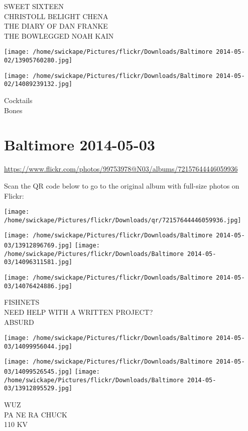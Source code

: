 \documentclass[10pt,letterpaper]{article}
\begin{document}
SWEET SIXTEEN\\
CHRISTOLL BELIGHT CHENA\\
THE DIARY OF DAN FRANKE\\
THE BOWLEGGED NOAH KAIN
\pagebreak

\texttt{[image: /home/swickape/Pictures/flickr/Downloads/Baltimore 2014-05-02/13905760280.jpg]}

\vspace{0.25in}
\texttt{[image: /home/swickape/Pictures/flickr/Downloads/Baltimore 2014-05-02/14089239132.jpg]}

Cocktails\\
Bones
\pagebreak

\section*{Baltimore 2014-05-03}

\url{https://www.flickr.com/photos/99753978@N03/albums/72157644446059936}

Scan the QR code below to go to the original album with full-size photos on Flickr:

\texttt{[image: /home/swickape/Pictures/flickr/Downloads/qr/72157644446059936.jpg]}
\pagebreak

\texttt{[image: /home/swickape/Pictures/flickr/Downloads/Baltimore 2014-05-03/13912896769.jpg]}
\texttt{[image: /home/swickape/Pictures/flickr/Downloads/Baltimore 2014-05-03/14096311581.jpg]}

\texttt{[image: /home/swickape/Pictures/flickr/Downloads/Baltimore 2014-05-03/14076424886.jpg]}

FISHNETS\\
NEED HELP WITH A WRITTEN PROJECT?\\
ABSURD
\pagebreak

\texttt{[image: /home/swickape/Pictures/flickr/Downloads/Baltimore 2014-05-03/14099956044.jpg]}

\vspace{0.25in}
\texttt{[image: /home/swickape/Pictures/flickr/Downloads/Baltimore 2014-05-03/14099526545.jpg]}
\texttt{[image: /home/swickape/Pictures/flickr/Downloads/Baltimore 2014-05-03/13912895529.jpg]}

WUZ\\
PA NE RA CHUCK\\
110 KV
\pagebreak
\end{document}
